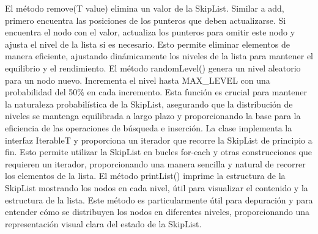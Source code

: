 \singlespacing
El método remove(T value) elimina un valor de la SkipList. Similar a add, primero encuentra las posiciones de los punteros que deben actualizarse. Si encuentra el nodo con el valor, actualiza los punteros para omitir este nodo y ajusta el nivel de la lista si es necesario. Esto permite eliminar elementos de manera eficiente, ajustando dinámicamente los niveles de la lista para mantener el equilibrio y el rendimiento.
\singlespacing
El método randomLevel() genera un nivel aleatorio para un nodo nuevo. Incrementa el nivel hasta MAX\_LEVEL con una probabilidad del 50\% en cada incremento. Esta función es crucial para mantener la naturaleza probabilística de la SkipList, asegurando que la distribución de niveles se mantenga equilibrada a largo plazo y proporcionando la base para la eficiencia de las operaciones de búsqueda e inserción.
\singlespacing
La clase implementa la interfaz Iterable\<T\> y proporciona un iterador que recorre la SkipList de principio a fin. Esto permite utilizar la SkipList en bucles for-each y otras construcciones que requieren un iterador, proporcionando una manera sencilla y natural de recorrer los elementos de la lista.
\singlespacing
El método printList() imprime la estructura de la SkipList mostrando los nodos en cada nivel, útil para visualizar el contenido y la estructura de la lista. Este método es particularmente útil para depuración y para entender cómo se distribuyen los nodos en diferentes niveles, proporcionando una representación visual clara del estado de la SkipList.

